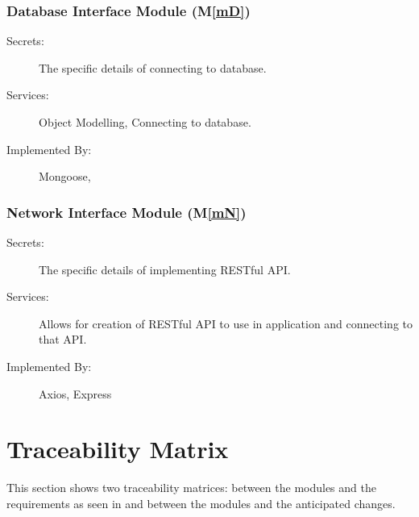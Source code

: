 \documentclass[12pt, titlepage]{article}
\newcommand{\mref}[1]{M\ref{#1}}
\begin{document}
\subsubsection{Database Interface Module (\mref{mD})}
\begin{description}
\item[Secrets:] The specific details of connecting to database.
\item[Services:] Object Modelling, Connecting to database. 
\item[Implemented By:] Mongoose, \progname{}
\end{description}

\subsubsection{Network Interface Module (\mref{mN})}
\begin{description}
\item[Secrets:] The specific details of implementing RESTful API.
\item[Services:] Allows for creation of RESTful API to use in application and connecting to that API. 
\item[Implemented By:] Axios, Express
\end{description}

\section{Traceability Matrix} \label{SecTM}

This section shows two traceability matrices: between the modules and the requirements as seen in \citep{SRS} and between the modules and the anticipated changes.
\end{document}
